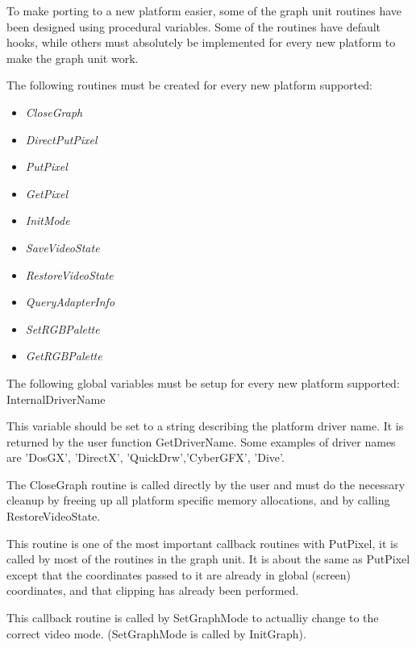 To make porting to a new platform easier, some of the graph unit routines
have been designed using procedural variables. Some of the routines have
default hooks, while others must absolutely be implemented for every new
platform to make the graph unit work.

The following routines must be created for every new platform supported:

\begin{itemize}
\item \textit{CloseGraph}
\item \textit{DirectPutPixel}
\item \textit{PutPixel}
\item \textit{GetPixel}
\item \textit{InitMode}
\item \textit{SaveVideoState}
\item \textit{RestoreVideoState}
\item \textit{QueryAdapterInfo}
\item \textit{SetRGBPalette}
\item \textit{GetRGBPalette}
\end{itemize}

The following global variables must be setup for every new platform
supported:
 InternalDriverName


This variable should be set to a string describing the platform driver
name. It is returned by the user function GetDriverName. Some examples
of driver names are 'DosGX', 'DirectX', 'QuickDrw','CyberGFX', 'Dive'.




The CloseGraph routine is called directly by the user and must
do the necessary cleanup by freeing up all platform specific
memory allocations, and by calling RestoreVideoState.


This routine is one of the most important callback routines with
PutPixel, it is called by most of the routines in the graph unit. It
is about the same as PutPixel except that the coordinates passed to
it are already in global (screen) coordinates, and that clipping has
already been performed.


This callback routine is called by SetGraphMode to actualliy change to
the correct video mode. (SetGraphMode is called by InitGraph).

